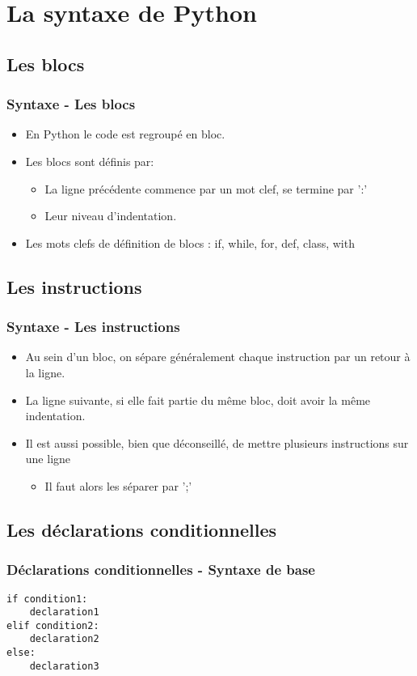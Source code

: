 \section{La syntaxe de Python}

\subsection{Les blocs}
\begin{frame}[fragile]
  \frametitle{Syntaxe - Les blocs}
  \begin{itemize}
    \item En Python le code est regroupé en bloc.
    \item Les blocs sont définis par:
    \begin{itemize}
      \item La ligne précédente commence par un mot clef, se termine par ':'
      \item Leur niveau d'indentation.
    \end{itemize}
    \item Les mots clefs de définition de blocs : \alert<1->{if}, \alert<2->{while}, \alert<3->{for}, \alert<4->{def}, \alert<5->{class}, \alert<6->{with}
  \end{itemize}

\end{frame}

\subsection{Les instructions}
\begin{frame}
  \frametitle{Syntaxe - Les instructions}
  \begin{itemize}
    \item<1-> Au sein d'un bloc, on sépare généralement chaque instruction par un retour à la ligne.
    \item<2-> La ligne suivante, si elle fait partie du même bloc, doit avoir la même indentation.
    \item<3-> Il est aussi possible, bien que déconseillé, de mettre plusieurs instructions sur une ligne
    \begin{itemize}
      \item<4-> Il faut alors les séparer par ';'
    \end{itemize}
  \end{itemize}
\end{frame}

\subsection{Les déclarations conditionnelles}
\begin{frame}[fragile]
  \frametitle{Déclarations conditionnelles - Syntaxe de base}
  \begin{lstlisting}
if condition1:
    declaration1
elif condition2:
    declaration2
else:
    declaration3
  \end{lstlisting}
\end{frame}

